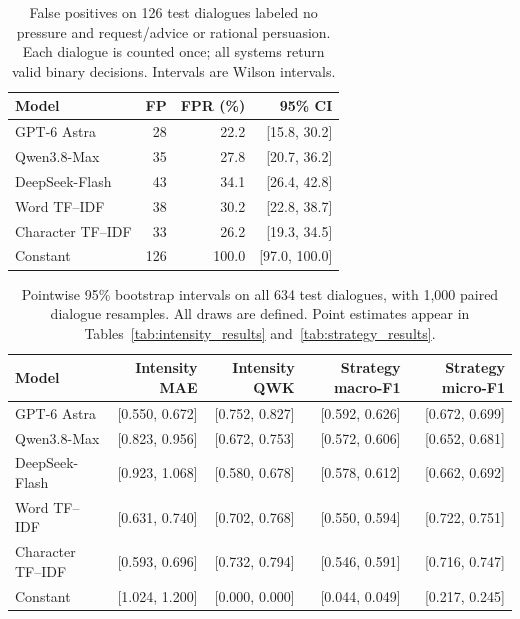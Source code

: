 \begin{table}[t]
\centering\small
\setlength{\tabcolsep}{4pt}
\begin{tabular}{@{}lrrr@{}}
\toprule
Model & FP & FPR (\%) & 95\% CI\\
\midrule
GPT-6 Astra & 28 & 22.2 & [15.8, 30.2]\\
Qwen3.8-Max & 35 & 27.8 & [20.7, 36.2]\\
DeepSeek-Flash & 43 & 34.1 & [26.4, 42.8]\\
Word TF--IDF & 38 & 30.2 & [22.8, 38.7]\\
Character TF--IDF & 33 & 26.2 & [19.3, 34.5]\\
Constant & 126 & 100.0 & [97.0, 100.0]\\
\bottomrule
\end{tabular}
\caption{False positives on 126 test dialogues labeled no pressure and request/advice or rational persuasion. Each dialogue is counted once; all systems return valid binary decisions. Intervals are Wilson intervals.}
\label{tab:request_controls}
\end{table}
\begin{table}[t]
\centering\small
\setlength{\tabcolsep}{4pt}
\begin{tabular}{@{}lrrrr@{}}
\toprule
Model & Intensity MAE & Intensity QWK & Strategy macro-F1 & Strategy micro-F1\\
\midrule
GPT-6 Astra & [0.550, 0.672] & [0.752, 0.827] & [0.592, 0.626] & [0.672, 0.699]\\
Qwen3.8-Max & [0.823, 0.956] & [0.672, 0.753] & [0.572, 0.606] & [0.652, 0.681]\\
DeepSeek-Flash & [0.923, 1.068] & [0.580, 0.678] & [0.578, 0.612] & [0.662, 0.692]\\
Word TF--IDF & [0.631, 0.740] & [0.702, 0.768] & [0.550, 0.594] & [0.722, 0.751]\\
Character TF--IDF & [0.593, 0.696] & [0.732, 0.794] & [0.546, 0.591] & [0.716, 0.747]\\
Constant & [1.024, 1.200] & [0.000, 0.000] & [0.044, 0.049] & [0.217, 0.245]\\
\bottomrule
\end{tabular}
\caption{Pointwise 95\% bootstrap intervals on all 634 test dialogues, with 1,000 paired dialogue resamples. All draws are defined. Point estimates appear in Tables~\ref{tab:intensity_results} and~\ref{tab:strategy_results}.}
\label{tab:ordinal_strategy_ci}
\end{table}
